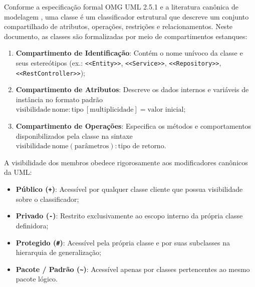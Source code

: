 Conforme a especificação formal OMG UML 2.5.1 \cite{omg2017} e a literatura canônica de modelagem \cite{fowler2003}, uma classe é um classificador estrutural que descreve um conjunto compartilhado de atributos, operações, restrições e relacionamentos. Neste documento, as classes são formalizadas por meio de compartimentos estanques:
\begin{enumerate}
    \item \textbf{Compartimento de Identificação}: Contém o nome unívoco da classe e seus estereótipos (ex.: \texttt{<<Entity>>}, \texttt{<<Service>>}, \texttt{<<Repository>>}, \texttt{<<RestController>>});
    \item \textbf{Compartimento de Atributos}: Descreve os dados internos e variáveis de instância no formato padrão $\text{visibilidade}\ \text{nome} : \text{tipo} \ [\text{multiplicidade}] = \text{valor inicial}$;
    \item \textbf{Compartimento de Operações}: Especifica os métodos e comportamentos disponibilizados pela classe na sintaxe $\text{visibilidade}\ \text{nome}(\text{parâmetros}) : \text{tipo de retorno}$.
\end{enumerate}

A visibilidade dos membros obedece rigorosamente aos modificadores canônicos da UML:
\begin{itemize}
    \item \textbf{Público (\texttt{+})}: Acessível por qualquer classe cliente que possua visibilidade sobre o classificador;
    \item \textbf{Privado (\texttt{-})}: Restrito exclusivamente ao escopo interno da própria classe definidora;
    \item \textbf{Protegido (\texttt{\#})}: Acessível pela própria classe e por suas subclasses na hierarquia de generalização;
    \item \textbf{Pacote / Padrão (\texttt{\~{}})}: Acessível apenas por classes pertencentes ao mesmo pacote lógico.
\end{itemize}

